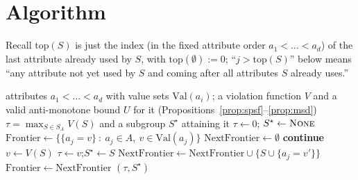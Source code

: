 \documentclass[11pt]{article}
\DeclareMathOperator{\argmax}{arg\,max}
\begin{document}
\section{Algorithm}

Recall $\mathrm{top}(S)$ is just the index (in the fixed attribute order
$a_1<\dots<a_d$) of the last attribute already used by $S$, with
$\mathrm{top}(\emptyset):=0$; ``$j>\mathrm{top}(S)$'' below means ``any attribute not
yet used by $S$ and coming after all attributes $S$ already uses.''

\begin{algorithm}[H]
\caption{Level-wise bound-and-prune search for $\argmax_{S\in S_A}V(S)$}
\label{alg:main}
\begin{algorithmic}[1]
\Require attributes $a_1<\dots<a_d$ with value sets $\mathrm{Val}(a_i)$; a violation
function $V$ and a valid anti-monotone bound $U$ for it (Propositions~\ref{prop:spsf}--\ref{prop:msd})
\Ensure $\tau=\max_{S\in S_A}V(S)$ and a subgroup $S^\star$ attaining it
\State $\tau \gets 0$; \quad $S^\star \gets \textsc{None}$
\State $\mathrm{Frontier} \gets \{\{a_j\!=\!v\}\ :\ a_j\in A,\ v\in\mathrm{Val}(a_j)\}$
  \State $\mathrm{NextFrontier}\gets\emptyset$
   
     
      \State \textbf{continue} 
    \EndIf
    \State $v \gets V(S)$ 
      \State $\tau\gets v$;\quad $S^\star\gets S$
    \EndIf
     
      \State $\mathrm{NextFrontier}\gets\mathrm{NextFrontier}\cup\{S\cup\{a_j\!=\!v'\}\}$
    \EndFor
  \EndFor
  \State $\mathrm{Frontier}\gets\mathrm{NextFrontier}$
\EndWhile
\State \Return $(\tau,S^\star)$
\end{algorithmic}
\end{algorithm}

\begin{center}
\end{center}
\end{document}
